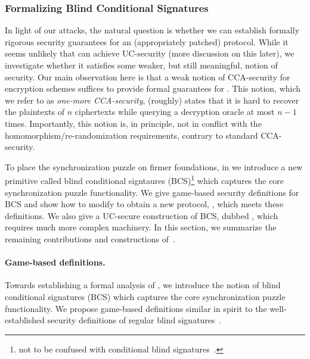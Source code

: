 \subsubsection{Formalizing Blind Conditional Signatures}\label{sec:bcs}

In light of our attacks, the natural question is whether we can establish formally rigorous security guarantees for an (appropriately patched) \AAL protocol. While it seems unlikely that \AAL can achieve UC-security (more discussion on this later), we investigate whether it satisfies some weaker, but still meaningful, notion of security. Our main observation here is that a weak notion of CCA-security for encryption schemes suffices to provide formal guarantees for \AAL. This notion, which we refer to as \emph{one-more CCA-security}, (roughly) states that it is hard to recover the plaintexts of $n$ ciphertexts while querying a decryption oracle at most $n-1$ times. Importantly, this notion is, in principle, not in conflict with the homomorphism/re-randomization requirements, contrary to standard CCA-security.

To place the synchronization puzzle on firmer foundations, in \cite{CCS:GMMMTT22} we introduce a new primitive called blind conditional signtaures (BCS)\footnote{not to be confused with conditional blind signatures~\cite{EPRINT:ZacGroPag17}.} which captures the core synchronization puzzle functionality. We give game-based security definitions for BCS and show how to modify \AAL to obtain a new protocol, \AALplus, which meets these definitions. We also give a UC-secure construction of BCS, dubbed \AALUC, which requires much more complex machinery. In this section, we summarize the remaining contributions and constructions of~\cite{CCS:GMMMTT22}. 

\paragraph{Game-based definitions.} Towards establishing a formal analysis of \AAL, we introduce the notion of blind conditional signatures (BCS) which captures the core synchronization puzzle functionality. We propose game-based definitions similar in spirit to the well-established security definitions of regular blind signatures~\cite{C:Chaum82,JC:SchUnr17}. 

